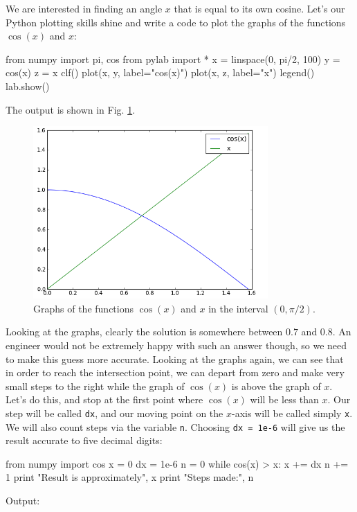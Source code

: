 We are interested in finding an angle $x$ that is equal
to its own cosine. Let's our Python plotting skills shine 
and write a code to plot the graphs of
the functions $\cos(x)$ and $x$:

\begin{bluecode}
from numpy import pi, cos
from pylab import *
x = linspace(0, pi/2, 100)
y = cos(x)
z = x
clf()
plot(x, y, label="cos(x)")
plot(x, z, label="x")
legend()
lab.show()
\end{bluecode}
The output is shown in Fig. \ref{fig:xcosx}.

\begin{figure}[!ht]
\begin{center}
\includegraphics[width=0.8\textwidth]{imgp/xcosx.png}
\end{center}
\vspace{-2mm}
\caption{Graphs of the functions $\cos(x)$ and $x$ in the interval $(0, \pi/2)$.}
\label{fig:xcosx}
\end{figure}
\noindent
Looking at the graphs, clearly the solution is somewhere 
between $0.7$ and $0.8$. 
An engineer would not be extremely happy with such an answer though, 
so we need to make this guess more accurate. Looking at the graphs again, we can see
that in order to reach the intersection point, we can depart from zero and make very 
small steps to the right while the graph of $\cos(x)$ is above the graph of $x$.
Let's do this, and stop 
at the first point where $\cos(x)$ will be less than $x$. Our step will be called {\tt dx},
and our moving point on the $x$-axis will be called simply {\tt x}. We will also count 
steps via the variable {\tt n}. Choosing {\tt dx = 1e-6} will give us the result accurate 
to five decimal digits:

\begin{bluecode}
from numpy import cos
x = 0
dx = 1e-6
n = 0
while cos(x) > x:
    x += dx
    n += 1
print "Result is approximately", x
print "Steps made:", n
\end{bluecode}
Output:

